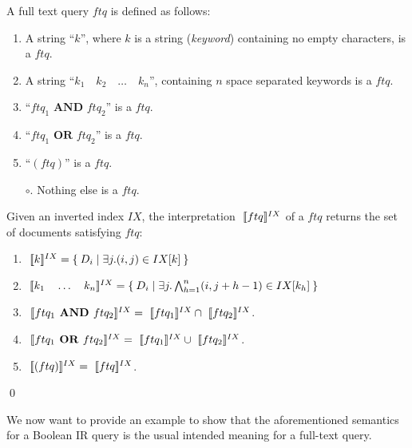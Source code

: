 \begin{definition}
A full text query $ftq$ is defined as follows:
\begin{enumerate}
	\item A string ``$k$'', where $k$ is a string (\textit{keyword})  containing no empty characters, is a $ftq$.
	\item A string ``$k_1\quad k_2\quad\dots\quad k_n$'', containing $n$ space separated keywords  is a $ftq$.
	\item ``$ftq_1 \textbf{ AND } ftq_2$'' is a $ftq$.
	\item ``$ftq_1 \textbf{ OR } ftq_2$'' is a $ftq$.
	\item ``$(ftq)$'' is a $ftq$.
	\item[$\circ$.] Nothing else is a $ftq$.
\end{enumerate} 
Given an inverted index $IX$, the interpretation $\sem[IX]{ftq}$ of a $ftq$ returns the set of documents satisfying  $ftq$:
\begin{enumerate}
	\item $\sem[IX]{k} = \Set{D_i|\exists j. (i,j)\in IX[k]}$ 
	\item $\sem[IX]{k_1\quad\dots\quad k_n} = \Set{D_i|\exists j. \bigwedge_{h=1}^{n}  (i,j+h-1)\in IX[k_h]}$ 
	\item $\sem[IX]{ftq_1 \textbf{ AND } ftq_2}=\sem[IX]{ftq_1}\cap \sem[IX]{ftq_2}$.
	\item $\sem[IX]{ftq_1 \textbf{ OR } ftq_2}=\sem[IX]{ftq_1}\cup \sem[IX]{ftq_2}$.
	\item $\sem[IX]{(ftq)}=\sem[IX]{ftq}$.
\end{enumerate} 
\qed
\end{definition}

We now want to provide an example to show that the aforementioned semantics for a Boolean IR query is the usual intended meaning for a full-text query.


